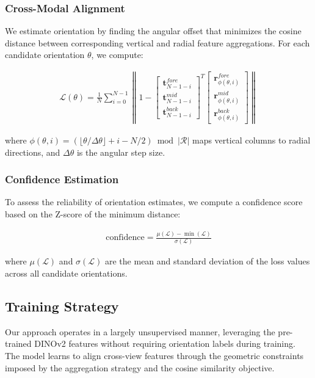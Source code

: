 \subsubsection{Cross-Modal Alignment}

We estimate orientation by finding the angular offset that minimizes the cosine distance between corresponding vertical and radial feature aggregations. For each candidate orientation $\theta$, we compute:

\begin{align}
\mathcal{L}(\theta) = \frac{1}{N} \sum_{i=0}^{N-1} \left\| 1 - \begin{bmatrix} \mathbf{t}_{N-1-i}^{fore} \\ \mathbf{t}_{N-1-i}^{mid} \\ \mathbf{t}_{N-1-i}^{back} \end{bmatrix}^T \begin{bmatrix} \mathbf{r}_{\phi(\theta,i)}^{fore} \\ \mathbf{r}_{\phi(\theta,i)}^{mid} \\ \mathbf{r}_{\phi(\theta,i)}^{back} \end{bmatrix} \right\|
\end{align}

where $\phi(\theta,i) = (\lfloor\theta/\Delta\theta\rfloor + i - N/2) \bmod |\mathcal{R}|$ maps vertical columns to radial directions, and $\Delta\theta$ is the angular step size.

\subsubsection{Confidence Estimation}

To assess the reliability of orientation estimates, we compute a confidence score based on the Z-score of the minimum distance:

\begin{align}
\text{confidence} = \frac{\mu(\mathcal{L}) - \min(\mathcal{L})}{\sigma(\mathcal{L})}
\end{align}

where $\mu(\mathcal{L})$ and $\sigma(\mathcal{L})$ are the mean and standard deviation of the loss values across all candidate orientations.

\subsection{Training Strategy}

Our approach operates in a largely unsupervised manner, leveraging the pre-trained DINOv2 features without requiring orientation labels during training. The model learns to align cross-view features through the geometric constraints imposed by the aggregation strategy and the cosine similarity objective.

